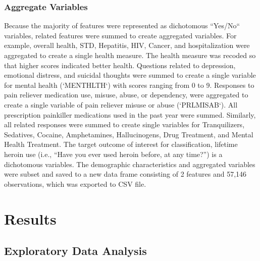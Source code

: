 \documentclass[sigconf]{acmart}
\begin{document}
\subsubsection{Aggregate Variables}

Because the majority of features were represented as dichotomous ``Yes/No`` 
variables, related features were summed to create aggregated variables. For 
example, overall health, STD, Hepatitis, HIV, Cancer, and hospitalization were 
aggregated to create a single health measure. The health measure was recoded
so that higher scores indicated better health. Questions related to depression, 
emotional distress, and suicidal thoughts were summed to create a single 
variable for mental health (`MENTHLTH`) with scores ranging from 0 to 9. 
Responses to pain reliever medication use, misuse, abuse, or dependency, 
were aggregated to create a single variable of pain reliever misuse or abuse
(`PRLMISAB`). All prescription painkiller medications used in the past year
were summed. Similarly, all related responses were summed to create single 
variables for Tranquilizers, Sedatives, Cocaine, Amphetamines, Hallucinogens, 
Drug Treatment, and Mental Health Treatment. The target outcome of interest for 
classification, lifetime heroin use (i.e., ``Have you ever used heroin before, 
at any time?'') is a dichotomous variables. The demographic characteristics 
and aggregated variables were subset and saved to a new data frame consisting 
of 2 features and 57,146 observations, which was exported to CSV file. 


\section{Results}

\subsection{Exploratory Data Analysis}
\end{document}
